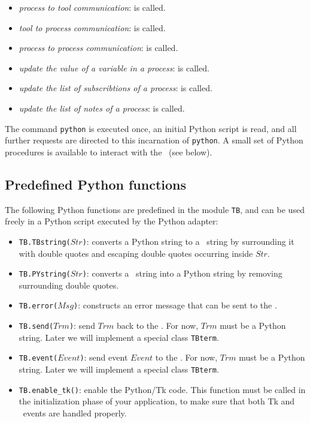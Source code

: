 \begin{itemize}
\begin{itemize}
  \item \emph{process to tool communication}:
     is
    called.
  \item \emph{tool to process communication}:
     is
    called.
  \item \emph{process to process communication}:
     is
    called.
  \item \emph{update the value of a variable in a process}:
     is called.
  \item \emph{update the list of subscribtions of a process}:
     is called.
  \item \emph{update the list of notes of a process}:
     is called.
  \end{itemize}
\end{itemize}

\noindent The command {\tt python} is executed once, an initial Python script
is read, and all further requests are directed to this incarnation
of {\tt python}. A small set of Python procedures is available to interact
with the \TB\ (see below).

\subsection{\label{Python-functions}Predefined Python functions}
The following Python functions are predefined in the module {\tt TB},
and can be used freely in a Python script executed by the Python adapter:
\begin{itemize}
\item {\tt TB.TBstring($Str$)\/}: converts a Python string to a \TB\ string by
surrounding it with double quotes and escaping double quotes occurring
inside $Str$.

\item {\tt TB.PYstring($Str$)\/}: converts a \TB\ string into  a Python string
by removing surrounding double quotes.

\item {\tt TB.error($Msg$)\/}: constructs an error message that can be sent
to the \TB.

\item {\tt TB.send($Trm$)\/}: send $Trm$ back to the \TB. For now, $Trm$ must
be a Python string. Later we will implement a special class {\tt TBterm}.

\item {\tt TB.event($Event$)\/}: send event $Event$ to the \TB. For now, $Trm$ must
be a Python string. Later we will implement a special class {\tt TBterm}.

\item {\tt TB.enable\_tk()\/}: enable the Python/Tk code. 
This function must be called in the initialization phase of your
application, to make sure that both Tk and \TB\ events are handled properly.

\end{itemize}

